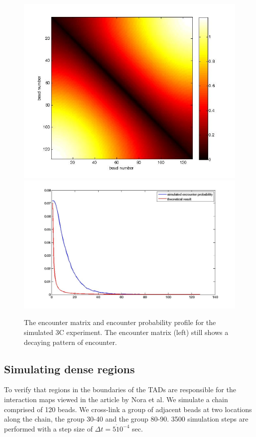 \documentclass[12pt]{book}
\begin{document}
\begin{figure}[H]
\includegraphics[scale=0.2]{encounterMatrix3cExperiment}
\includegraphics[scale=0.2]{encounterProbabilityBead1OfThe3cSimulation128Beads}
\caption{The encounter matrix and encounter probability profile for the simulated 3C experiment. The encounter matrix (left) still shows a decaying pattern of encounter.}
\end{figure}

\subsection{Simulating dense regions}
To verify that regions in the boundaries of the TADs are responsible for the interaction maps viewed in the article by Nora et al. We simulate a chain comprised of 120 beads. We cross-link a group of adjacent beads at two locations along the chain, the group 30-40 and the group 80-90. 3500 simulation steps are performed with a step size of $\Delta t = 5\dot10^{-4}$ sec. 
\end{document}
